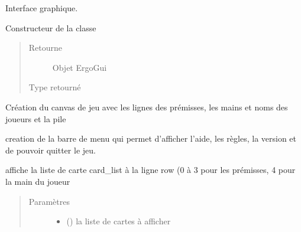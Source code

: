 \documentclass[letterpaper,10pt,french]{sphinxmanual}
\begin{document}
\begin{fulllineitems}
\label{\detokenize{doc_classe:gui.ErgoGui}}
Interface graphique.

\begin{fulllineitems}
\label{\detokenize{doc_classe:gui.ErgoGui.__init__}}
Constructeur de la classe
\begin{quote}\begin{description}
\item[{Retourne}] \leavevmode
Objet ErgoGui

\item[{Type retourné}] \leavevmode
{\hyperref[\detokenize{doc_classe:gui.ErgoGui}]{}}

\end{description}\end{quote}

\end{fulllineitems}


\begin{fulllineitems}
\label{\detokenize{doc_classe:gui.ErgoGui.__init_canvas__}}
Création du canvas de jeu avec les lignes des prémisses, les mains
et noms des joueurs et la pile

\end{fulllineitems}


\begin{fulllineitems}
\label{\detokenize{doc_classe:gui.ErgoGui.__init_menu__}}
creation de la barre de menu qui permet d’afficher l’aide,
les règles, la version et de pouvoir quitter le jeu.

\end{fulllineitems}


\begin{fulllineitems}
\label{\detokenize{doc_classe:gui.ErgoGui.affiche_cards}}
affiche la liste de carte card\_list à la ligne row (0 à 3 pour les
prémisses, 4 pour la main du joueur
\begin{quote}\begin{description}
\item[{Paramètres}] \leavevmode\begin{itemize}
\item {} 
 () \textendash{} la liste de cartes à afficher


\end{itemize}
\end{description}
\end{quote}
\end{fulllineitems}
\end{fulllineitems}
\end{document}
